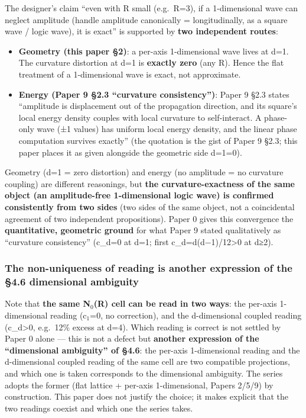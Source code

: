 \documentclass[
]{ltjsarticle}
\providecommand{\tightlist}{%
  \setlength{\itemsep}{0pt}\setlength{\parskip}{0pt}}
\begin{document}
The designer's claim ``even with R small (e.g.~R=3), if a 1-dimensional
wave can neglect amplitude (handle amplitude canonically =
longitudinally, as a square wave / logic wave), it is exact'' is
supported by \textbf{two independent routes}:

\begin{itemize}
\tightlist
\item
  \textbf{Geometry (this paper §2)}: a per-axis 1-dimensional wave lives
  at d=1. The curvature distortion at d=1 is \textbf{exactly zero} (any
  R). Hence the flat treatment of a 1-dimensional wave is exact, not
  approximate.
\item
  \textbf{Energy (Paper 9 §2.3 ``curvature consistency'')}: Paper 9 §2.3
  states ``amplitude is displacement out of the propagation direction,
  and its square's local energy density couples with local curvature to
  self-interact. A phase-only wave (±1 values) has uniform local energy
  density, and the linear phase computation survives exactly'' (the
  quotation is the gist of Paper 9 §2.3; this paper places it as given
  alongside the geometric side d=1=0).
\end{itemize}

Geometry (d=1 = zero distortion) and energy (no amplitude = no curvature
coupling) are different reasonings, but \textbf{the curvature-exactness
of the same object (an amplitude-free 1-dimensional logic wave) is
confirmed consistently from two sides} (two sides of the same object,
not a coincidental agreement of two independent propositions). Paper 0
gives this convergence the \textbf{quantitative, geometric ground} for
what Paper 9 stated qualitatively as ``curvature consistency'' (c\_d=0
at d=1; first c\_d=d(d−1)/12\textgreater0 at d≥2).

\subsubsection{The non-uniqueness of reading is another expression of
the §4.6 dimensional
ambiguity}\label{the-non-uniqueness-of-reading-is-another-expression-of-the-4.6-dimensional-ambiguity}

Note that \textbf{the same N\(_{0}\)(R) cell can be read in two ways}:
the per-axis 1-dimensional reading (c\(_{1}\)=0, no correction), and the
d-dimensional coupled reading (c\_d\textgreater0, e.g.~12\% excess at
d=4). Which reading is correct is not settled by Paper 0 alone --- this
is not a defect but \textbf{another expression of the ``dimensional
ambiguity'' of §4.6}: the per-axis 1-dimensional reading and the
d-dimensional coupled reading of the same cell are two compatible
projections, and which one is taken corresponds to the dimensional
ambiguity. The series adopts the former (flat lattice + per-axis
1-dimensional, Papers 2/5/9) by construction. This paper does not
justify the choice; it makes explicit that the two readings coexist and
which one the series takes.
\end{document}
